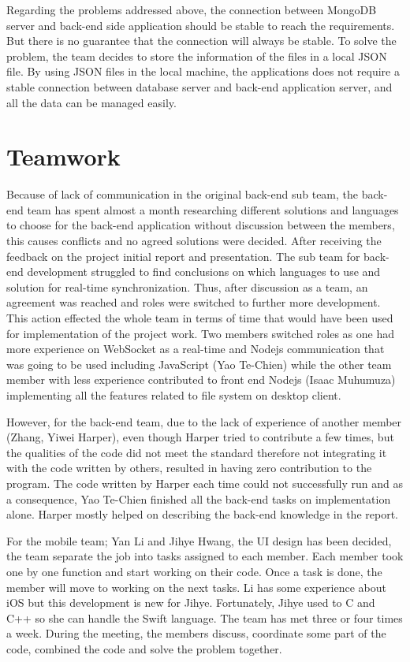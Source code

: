 \documentclass{article}
\begin{document}
Regarding the problems addressed above, the connection between MongoDB server and back-end side application should be stable to reach the requirements. But there is no guarantee that the connection will always be stable. To solve the problem, the team decides to store the information of the files in a local JSON file. By using JSON files in the local machine, the applications does not require a stable connection between database server and back-end application server, and all the data can be managed easily.

\section{Teamwork}
Because of lack of communication in the original back-end sub team, the back-end team has spent almost a month researching different solutions and languages to choose for the back-end application without discussion between the members, this causes conflicts and no agreed solutions were decided. After receiving the feedback on the project initial report and presentation. The sub team for back-end development struggled to find conclusions on which languages to use and solution for real-time synchronization. Thus, after discussion as a team, an agreement was reached and roles were switched to further more development. This action effected the whole team in terms of time that would have been used for implementation of the project work. Two members switched roles as one had more experience on WebSocket as a real-time and Nodejs communication that was going to be used including JavaScript (Yao Te-Chien) while the other team member with less experience contributed to front end Nodejs (Isaac Muhumuza) implementing all the features related to file system on desktop client.

However, for the back-end team, due to the lack of experience of another member (Zhang, Yiwei Harper), even though Harper tried to contribute a few times, but the qualities of the code did not meet the standard therefore not integrating it with the code written by others, resulted in having zero contribution to the program. The code written by Harper each time could not successfully run and as a consequence, Yao Te-Chien finished all the back-end tasks on implementation alone. Harper mostly helped on describing the back-end knowledge in the report. 

For the mobile team; Yan Li and Jihye Hwang, the UI design has been decided, the team separate the job into tasks assigned to each member. Each member took one by one function and start working on their code. Once a task is done, the member will move to working on the next tasks. Li has some experience about iOS but this development is new for Jihye. Fortunately, Jihye used to C and C++ so she can handle the Swift language. The team has met three or four times a week. During the meeting, the members discuss, coordinate some part of the code, combined the code and solve the problem together.
\end{document}
